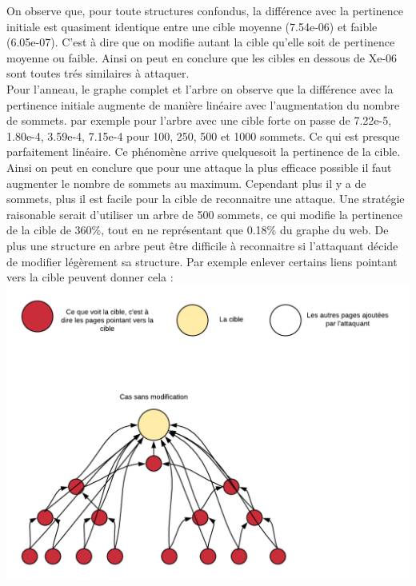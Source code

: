 \documentclass[a4paper,11pt]{article}
\begin{document}
		On observe que, pour toute structures confondus, la différence avec la pertinence initiale est quasiment identique entre une cible moyenne (7.54e-06) et faible (6.05e-07).
		C'est à dire que on modifie autant la cible qu'elle soit de pertinence moyenne ou faible. Ainsi on peut en conclure que les cibles en dessous de Xe-06 sont toutes trés similaires à attaquer.\\
		
		Pour l'anneau, le graphe complet et l'arbre on observe que la différence avec la pertinence initiale augmente de manière linéaire avec l'augmentation du nombre de sommets.
		par exemple pour l'arbre avec une cible forte on passe de 7.22e-5, 1.80e-4, 3.59e-4, 7.15e-4 pour 100, 250, 500 et 1000 sommets. Ce qui est presque parfaitement linéaire.
		Ce phénomène arrive quelquesoit la pertinence de la cible. Ainsi on peut en conclure que pour une attaque la plus efficace possible il faut augmenter le nombre de sommets au maximum.
		Cependant plus il y a de sommets, plus il est facile pour la cible de reconnaitre une attaque. Une stratégie raisonable serait d'utiliser un arbre de 500 sommets, 
		ce qui modifie la pertinence de la cible de 360\%, tout en ne représentant que 0.18\% du graphe du web. De plus une structure en arbre peut être difficile à reconnaitre si l'attaquant décide 
		de modifier légèrement sa structure. Par exemple enlever certains liens pointant vers la cible peuvent donner cela : 
		\includegraphics[scale = 0.5]{Captures/diagramme1.png}\\
\end{document}
